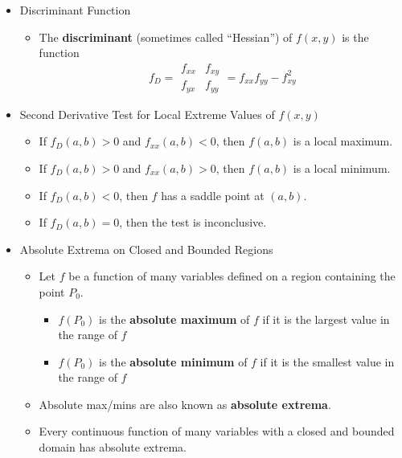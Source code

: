 \documentclass[12pt]{article}
\newcommand{\<}{\left<}
\renewcommand{\>}{\right>}
\begin{document}
\begin{itemize}
  \item Discriminant Function
    \begin{itemize}
      \item The \textbf{discriminant} (sometimes called ``Hessian'') of $f(x,y)$ is the function
        \[
          f_D = \begin{array}{|cc|}f_{xx}&f_{xy}\\f_{yx}&f_{yy}\end{array} = f_{xx}f_{yy} - f_{xy}^2
        \]
    \end{itemize}

  \newpage

  \item Second Derivative Test for Local Extreme Values of $f(x,y)$
  
    \begin{itemize}
      \item If $f_D(a,b)>0$ and $f_{xx}(a,b)<0$, then $f(a,b)$ is a local maximum.
      \item If $f_D(a,b)>0$ and $f_{xx}(a,b)>0$, then $f(a,b)$ is a local minimum.
      \item If $f_D(a,b)<0$, then $f$ has a saddle point at $(a,b)$.
      \item If $f_D(a,b)=0$, then the test is inconclusive.
    \end{itemize}
    
  \item Absolute Extrema on Closed and Bounded Regions
  
    \begin{itemize}
    \item Let $f$ be a function of many variables defined on a region containing the point $P_0$.
      \begin{itemize}
      \item $f(P_0)$ is the \textbf{absolute maximum} of $f$ if it is the largest value in the range of $f$
      \item $f(P_0)$ is the \textbf{absolute minimum} of $f$ if it is the smallest value in the range of $f$
      \end{itemize}
    \item Absolute max/mins are also known as \textbf{absolute extrema}.
    \item Every continuous function of many variables with a closed and bounded domain has absolute extrema.
    \end{itemize}
    

\end{itemize}
\end{document}
